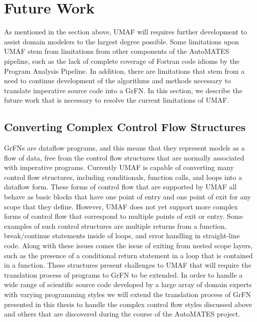 \section{Future Work\label{sec:future_work}}
As mentioned in the section above, UMAF will requires further development to assist domain modelers to the largest degree possible.
Some limitations upon UMAF stem from limitations from other components of the AutoMATES pipeline, such as the lack of complete coverage of Fortran code idioms by the Program Analysis Pipeline.
In addition, there are limitations that stem from a need to continue development of the algorithms and methods necessary to translate imperative source code into a GrFN.
In this section, we describe the future work that is necessary to resolve the current limitations of UMAF.

\subsection{Converting Complex Control Flow Structures \label{sec:early_exit}}
GrFNs are dataflow programs, and this means that they represent models as a flow of data, free from the control flow structures that are normally associated with imperative programs.
Currently UMAF is capable of converting many control flow structures, including conditionals, function calls, and loops into a dataflow form.
These forms of control flow that are supported by UMAF all behave as basic blocks that have one point of entry and one point of exit for any scope that they define.
However, UMAF does not yet support more complex forms of control flow that correspond to multiple points of exit or entry.
Some examples of such control structures are multiple returns from a function, break/continue statements inside of loops, and error handling in straight-line code.
Along with these issues comes the issue of exiting from nested scope layers, such as the presence of a conditional return statement in a loop that is contained in a function.
These structures present challenges to UMAF that will require the translation process of programs to GrFN to be extended.
In order to handle a wide range of scientific source code developed by a large array of domain experts with varying programming styles we will extend the translation process of GrFN presented in this thesis to handle the complex control flow styles discussed above and others that are discovered during the course of the AutoMATES project.

